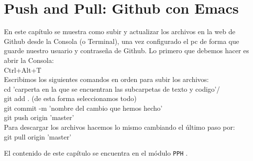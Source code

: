 \chapter{Push and Pull: Github con Emacs}\label{sec:githubHas}

En este capítulo se muestra como subir y actualizar los archivos en la web de Github desde la Consola (o Terminal), una vez configurado el pc de forma que guarde nuestro usuario y contraseña de Github. Lo primero que debemos hacer es abrir la Consola:\\

Ctrl+Alt+T\\

Escribimos los siguientes comandos en orden para subir los archivos:\\

cd 'carperta en la que se encuentran las subcarpetas de texto y codigo'/ \\

git add .  (de esta forma seleccionamos todo)\\

git commit -m 'nombre del cambio que hemos hecho'\\

git push origin 'master'\\


Para descargar los archivos hacemos lo mismo cambiando el último paso por:\\

git pull origin 'master'


El contenido de este capítulo se encuentra en el módulo \texttt{PPH} 
.

